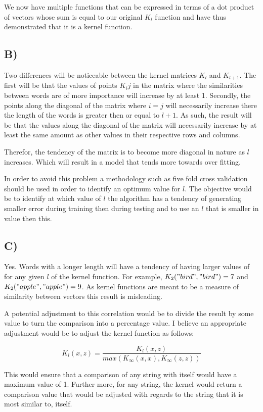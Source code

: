 \documentclass{report}
\begin{document}
We now have multiple functions that can
be expressed in terms of a dot product of vectors whose sum is equal to our original $K_l$
function and have thus demonstrated that it is a kernel function.

\subsection*{B)}
Two differences will be noticeable between the kernel matrices $K_l$ and $K_{l+1}$.
The first will be that the values of points $K_ij$ in the matrix where the similarities
between words are of more importance will increase by at least 1. Secondly, the points
along the diagonal of the matrix where $i=j$ will necessarily increase there the
length of the words is greater then or equal to $l+1$. As such, the result will be that
the values along the diagonal of the matrix will necessarily increase by at least
the same amount as other values in their respective rows and columns.

Therefor, the tendency of the matrix is to become more diagonal in nature as $l$
increases. Which will result in a model that tends more towards over fitting.

In order to avoid this problem a methodology such as five fold cross validation
should be used in order to identify an optimum value for $l$. The objective would be
to identify at which value of $l$ the algorithm has a tendency of generating smaller
error during training then during testing and to use an $l$ that is smaller in value
then this.
\subsection*{C)}
Yes. Words with a longer length will have a tendency of having larger values of
for any given $l$ of the kernel function. For example, $K_2("bird","bird")=7$ and
$K_2("apple","apple")=9$. As kernel functions are meant to be a measure of
similarity between vectors this result is misleading.

A potential adjustment to this correlation would be to divide the result by some
value to turn the comparison into a percentage value. I believe an appropriate adjustment
would be to adjust the kernel function as follows:

\begin{equation}
  K_l(x, z) = \frac{K_l(x, z)}{max(K_{\infty}(x, x),K_{\infty}(z, z))}
\end{equation}

This would ensure that a comparison of any string with itself would have a maximum value of 1.
Further more, for any string, the kernel would return a comparison value that would
be adjusted with regards to the string that it is most similar to, itself.
\end{document}
